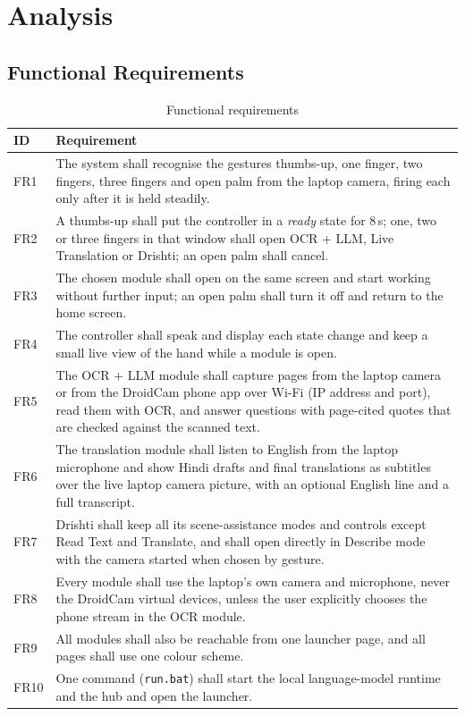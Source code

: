 \documentclass[12pt,singleside,a4paper]{article}
\begin{document}
\section{Analysis}
\subsection{Functional Requirements}
\begin{table}[H]
\centering
\caption{Functional requirements}
\label{tab:fr}
\small
\begin{tabularx}{\textwidth}{@{}p{1.1cm}X@{}}
\toprule
\textbf{ID} & \textbf{Requirement} \\
\midrule
FR1 & The system shall recognise the gestures thumbs-up, one finger, two fingers, three fingers and open palm from the laptop camera, firing each only after it is held steadily. \\
FR2 & A thumbs-up shall put the controller in a \emph{ready} state for 8\,s; one, two or three fingers in that window shall open OCR + LLM, Live Translation or Drishti; an open palm shall cancel. \\
FR3 & The chosen module shall open on the same screen and start working without further input; an open palm shall turn it off and return to the home screen. \\
FR4 & The controller shall speak and display each state change and keep a small live view of the hand while a module is open. \\
FR5 & The OCR + LLM module shall capture pages from the laptop camera or from the DroidCam phone app over Wi-Fi (IP address and port), read them with OCR, and answer questions with page-cited quotes that are checked against the scanned text. \\
FR6 & The translation module shall listen to English from the laptop microphone and show Hindi drafts and final translations as subtitles over the live laptop camera picture, with an optional English line and a full transcript. \\
FR7 & Drishti shall keep all its scene-assistance modes and controls except Read Text and Translate, and shall open directly in Describe mode with the camera started when chosen by gesture. \\
FR8 & Every module shall use the laptop's own camera and microphone, never the DroidCam virtual devices, unless the user explicitly chooses the phone stream in the OCR module. \\
FR9 & All modules shall also be reachable from one launcher page, and all pages shall use one colour scheme. \\
FR10 & One command (\texttt{run.bat}) shall start the local language-model runtime and the hub and open the launcher. \\
\bottomrule
\end{tabularx}
\end{table}
\end{document}
